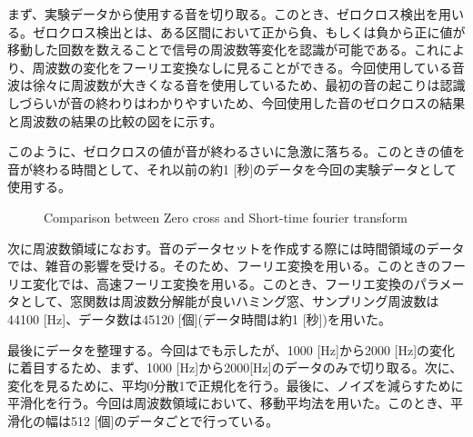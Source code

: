 まず、実験データから使用する音を切り取る。このとき、ゼロクロス検出を用いる。ゼロクロス検出とは、ある区間において正から負、もしくは負から正に値が移動した回数を数えることで信号の周波数等変化を認識が可能である。これにより、周波数の変化をフーリエ変換なしに見ることができる。今回使用している音波は徐々に周波数が大きくなる音を使用しているため、最初の音の起こりは認識しづらいが音の終わりはわかりやすいため、今回使用した音のゼロクロスの結果と周波数の結果の比較の図をに示す。

このように、ゼロクロスの値が音が終わるさいに急激に落ちる。このときの値を音が終わる時間として、それ以前の約1 [秒]のデータを今回の実験データとして使用する。

\begin{figure}[ht]
  \centering
  \label{fig:0cross}
  \centering
  \label{fig:stft}
 \caption{Comparison between Zero cross and Short-time fourier transform}\label{fig:compare_stft_0cross}
\end{figure}

次に周波数領域になおす。音のデータセットを作成する際には時間領域のデータでは、雑音の影響を受ける。そのため、フーリエ変換を用いる。このときのフーリエ変化では、高速フーリエ変換を用いる。このとき、フーリエ変換のパラメータとして、窓関数は周波数分解能が良いハミング窓、サンプリング周波数は44100 [Hz]、データ数は45120 [個](データ時間は約1 [秒])を用いた。

最後にデータを整理する。今回はでも示したが、1000 [Hz]から2000 [Hz]の変化に着目するため、まず、1000 [Hz]から2000[Hz]のデータのみで切り取る。次に、変化を見るために、平均0分散1で正規化を行う。最後に、ノイズを減らすために平滑化を行う。今回は周波数領域において、移動平均法を用いた。このとき、平滑化の幅は512 [個]のデータごとで行っている。


